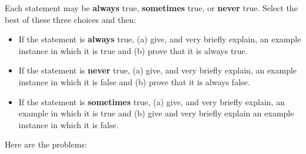 \documentclass[11pt,fleqn]{exam}
\begin{document}
Each statement may be \textbf{always} true, \textbf{sometimes} true, or \textbf{never} true. Select the best of these three choices and then:
\begin{itemize}
  \item If the statement is \textbf{always} true, (a) give, and very briefly explain, an example instance in which it is true and (b) prove that it is always true.
  \item If the statement is \textbf{never} true, (a) give, and very briefly explain, an example instance in which it is false and (b) prove that it is always false.
  \item If the statement is \textbf{sometimes} true, (a) give, and very briefly explain, an example in which it is true and (b) give and very briefly explain an example instance in which it is false.
\end{itemize}
Here are the problems:
\end{document}
